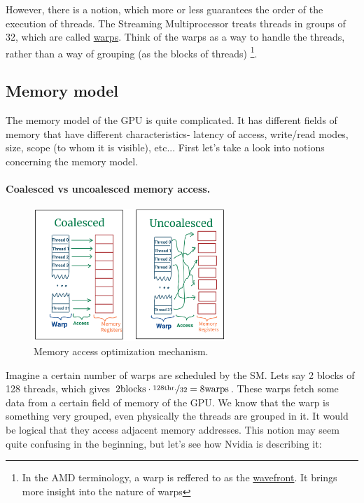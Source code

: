 \documentclass[12pt]{article}
\begin{document}
However, there is a notion, which more or less guarantees the order of the execution of threads. 
The Streaming Multiprocessor
treats threads in groups of 32, which are called \underline{warps}. Think of the warps as a way to handle 
the threads, rather than 
a way of grouping (as the blocks of threads) \footnote{In the AMD terminology, a warp is reffered to as the 
\underline{wavefront}. It brings more insight into the nature of warps}.

\subsection{Memory model}
The memory model of the GPU is quite complicated. It has different fields of memory that have different characteristics-
latency of access, write/read modes, size, scope (to whom it is visible), etc... First let's take a look into 
notions concerning the memory model.
\vspace{-15pt}
\paragraph{Coalesced vs uncoalesced memory access.} 

\begin{figure}
      \vspace{-10pt}
      \centering
      \includegraphics[height=5cm]{pngs/coalesced.png}
   \caption{Memory access optimization mechanism.}
   \label{coalesced}
\end{figure}

Imagine a certain number of warps are scheduled by the SM. Lets say 2 blocks of 128 threads, which gives 
$2\text{blocks}\cdot\nicefrac{128\text{thr.}}{32} = 8 \text{warps}$. These warps fetch some data 
from a certain field of memory of the GPU. We know that the warp is something very grouped, even physically 
the threads are grouped in it. It would be logical that they access adjacent memory addresses. This notion 
may seem quite confusing in the beginning, but let's see how Nvidia is describing it\cite{center}:
\end{document}
